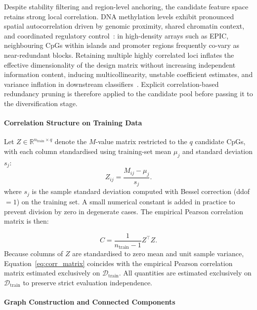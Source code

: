Despite stability filtering and region-level anchoring, the 
candidate feature space retains strong local correlation. DNA 
methylation levels exhibit pronounced spatial autocorrelation 
driven by genomic proximity, shared chromatin context, and 
coordinated regulatory control~\cite{Hansen2011, Aryee2014}: 
in high-density arrays such as EPIC, neighbouring CpGs within 
islands and promoter regions frequently co-vary as near-redundant 
blocks. Retaining multiple highly correlated loci inflates the 
effective dimensionality of the design matrix without increasing 
independent information content, inducing multicollinearity, 
unstable coefficient estimates, and variance inflation in 
downstream classifiers~\cite{Donoho2000, Hall2005}. Explicit 
correlation-based redundancy pruning is therefore applied to 
the candidate pool before passing it to the diversification 
stage.

\paragraph{Correlation Structure on Training Data}

Let $Z \in \mathbb{R}^{n_{\mathrm{train}} \times q}$ denote 
the $M$-value matrix restricted to the $q$ candidate CpGs, 
with each column standardised using training-set mean $\mu_j$ 
and standard deviation $s_j$:
\begin{equation}
Z_{ij}
=
\frac{M_{ij} - \mu_j}{s_j}.
\end{equation}
where $s_j$ is the sample standard deviation computed with Bessel correction 
(ddof $=1$) on the training set. A small numerical constant is added in practice 
to prevent division by zero in degenerate cases.
The empirical Pearson correlation matrix is then:

\begin{equation}
C
=
\frac{1}{n_{\mathrm{train}} - 1}
Z^{\top} Z.
\label{eq:corr_matrix}
\end{equation}
Because columns of $Z$ are standardised to zero mean and unit sample variance, 
Equation~\eqref{eq:corr_matrix} coincides with the empirical Pearson 
correlation matrix estimated exclusively on $\mathcal{D}_{\mathrm{train}}$.
All quantities are estimated exclusively on 
$\mathcal{D}_{\mathrm{train}}$ to preserve strict 
evaluation independence.

\paragraph{Graph Construction and Connected Components}

